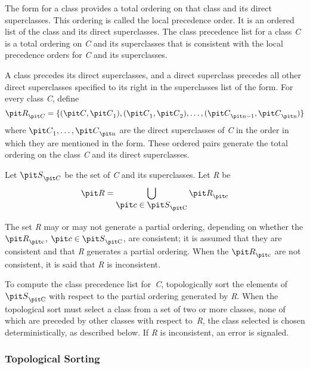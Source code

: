 The  form for a class provides a total ordering on that
class and its direct superclasses.  This ordering is called the {\bit
local precedence order}.  It is an ordered list of the class and its
direct superclasses. The {\bit class precedence list\/} for a
class {\it C} is a total ordering on {\it C} and its superclasses that is consistent
with the local precedence orders for {\it C} and its superclasses.

A class precedes its direct superclasses, and a
direct superclass precedes all other direct superclasses specified to
its right in the superclasses list of the  form.  For
every class {\it C}, define
$${\it R}\sub {\it C}=\{({\it C},{\it C}\sub 1),({\it C}\sub 1,{\it C}\sub 2),\ldots,({\it C}\sub {\hbox{\scriptsize\it n}-1},{\it C}\sub {\hbox{\scriptsize\it n}})\}$$
where ${\it C}\sub 1,\ldots,{\it C}\sub {\hbox{\scriptsize\it n}}$ are
the direct superclasses of {\it C} in the order in which
they are mentioned in the  form. These ordered pairs
generate the total ordering on the class {\it C} and its direct
superclasses.

Let ${\it S}\sub {\it C}$ be the set of {\it C} and its superclasses. Let {\it R} be
$${\it R}=\bigcup\sub{\textstyle {\it c}\in {{\it S}\sub {\hbox{\scriptsize\it C}}}} {\it R}\sub {\hbox{\scriptsize\it c}}$$

The set {\it R} may or may not generate a partial ordering, depending on
whether the ${\it R}\sub {\hbox{\scriptsize\it c}}$, ${\it c}\in {\it S}\sub {\hbox{\scriptsize\it C}}$,
are consistent; it is assumed
that they are consistent and that {\it R} generates a partial ordering.
When the ${\it R}\sub {\hbox{\scriptsize\it c}}$ are not consistent, it is said that {\it R} is inconsistent.


To compute the class precedence list for~{\it C},
topologically sort the elements of ${\it S}\sub {\hbox{\scriptsize\it C}}$ with respect to the
partial ordering generated by {\it R}.  When the topological
sort must select a class from a set of two or more classes, none of
which are preceded by other classes with respect to~{\it R},
the class selected is chosen deterministically, as described below.
If {\it R} is inconsistent, an error is signaled.



\subsubsection{Topological Sorting}

